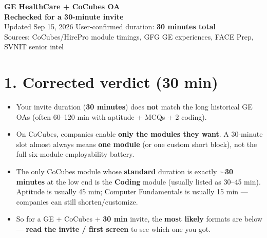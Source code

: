 \documentclass[a4paper,10pt]{article}
\begin{document}
\begin{center}
  {\LARGE\textbf{GE HealthCare + CoCubes OA}}\\[2pt]
  {\large\color{warn}\textbf{Rechecked for a 30-minute invite}}\\[3pt]
  {\small\color{muted}Updated Sep 15, 2026 \textbar{} User-confirmed duration: \textbf{30 minutes total}}\\[2pt]
  {\small\color{muted}Sources: CoCubes/HirePro module timings, GFG GE experiences, FACE Prep, SVNIT senior intel}
\end{center}

\section{1. Corrected verdict (30 min)}
\begin{itemize}
  \item Your invite duration (\textbf{30 minutes}) does \textbf{not} match the long historical GE OAs (often 60--120 min with aptitude + MCQs + 2 coding).
  \item On CoCubes, companies enable \textbf{only the modules they want}. A 30-minute slot almost always means \textbf{one module} (or one custom short block), not the full six-module employability battery.
  \item The only CoCubes module whose \textbf{standard} duration is exactly \textbf{$\sim$30 minutes} at the low end is the \textbf{Coding} module (usually listed as 30--45 min). Aptitude is usually 45 min; Computer Fundamentals is usually 15 min --- companies can still shorten/customize.
  \item So for a GE + CoCubes + \textbf{30 min} invite, the \textbf{most likely} formats are below --- \textbf{read the invite / first screen} to see which one you got.
\end{itemize}
\end{document}
